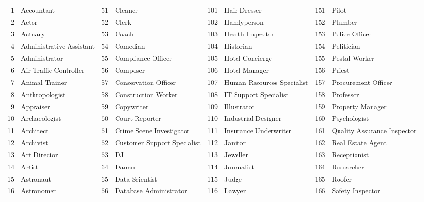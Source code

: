 {\begin{longtable}{r p{2.5cm} r p{2.5cm} r p{2.5cm} r p{2.5cm}}
1  & Accountant              & 51  & Cleaner                 & 101 & Hair Dresser            & 151 & Pilot                   \\
2  & Actor                   & 52  & Clerk                   & 102 & Handyperson             & 152 & Plumber                 \\
3  & Actuary                 & 53  & Coach                   & 103 & Health Inspector        & 153 & Police Officer          \\
4  & Administrative Assistant & 54 & Comedian                & 104 & Historian               & 154 & Politician              \\
5  & Administrator           & 55  & Compliance Officer      & 105 & Hotel Concierge         & 155 & Postal Worker           \\
6  & Air Traffic Controller  & 56  & Composer                & 106 & Hotel Manager           & 156 & Priest                  \\
7  & Animal Trainer          & 57  & Conservation Officer    & 107 & Human Resources Specialist & 157 & Procurement Officer  \\
8  & Anthropologist          & 58  & Construction Worker     & 108 & IT Support Specialist   & 158 & Professor               \\
9  & Appraiser               & 59  & Copywriter              & 109 & Illustrator             & 159 & Property Manager        \\
10 & Archaeologist           & 60  & Court Reporter          & 110 & Industrial Designer     & 160 & Psychologist            \\
11 & Architect               & 61  & Crime Scene Investigator & 111 & Insurance Underwriter  & 161 & Quality Assurance Inspector \\
12 & Archivist               & 62  & Customer Support Specialist & 112 & Janitor              & 162 & Real Estate Agent       \\
13 & Art Director            & 63  & DJ                      & 113 & Jeweller                & 163 & Receptionist            \\
14 & Artist                  & 64  & Dancer                  & 114 & Journalist              & 164 & Researcher              \\
15 & Astronaut               & 65  & Data Scientist          & 115 & Judge                   & 165 & Roofer                  \\
16 & Astronomer              & 66  & Database Administrator  & 116 & Lawyer                  & 166 & Safety Inspector        \\

\end{longtable}}
